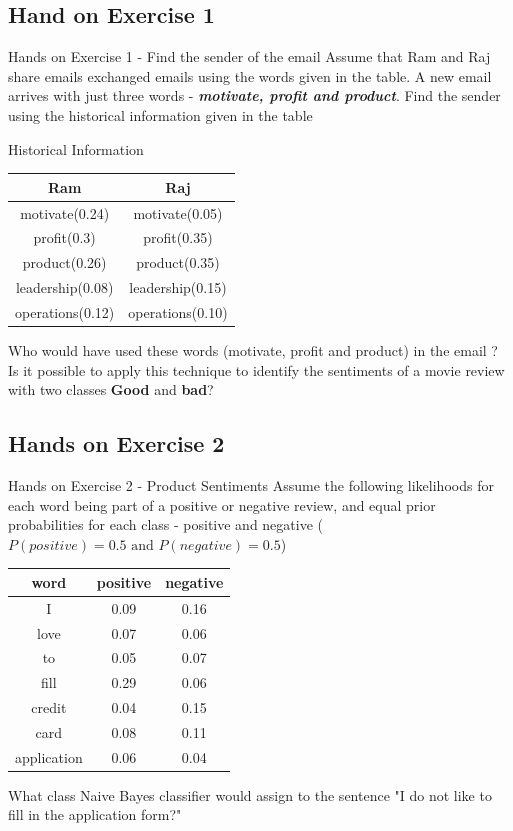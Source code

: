 	\subsection{Hand on Exercise 1 }
	\begin{frame}{Hands on Exercise 1 - Find the sender of the email}
		Assume that Ram and Raj share emails exchanged emails using the words given in the table. A new email arrives with just three words -
		\textbf{\textit{motivate, profit and product}}.
		Find the sender using the historical information given in the table\\
		\begin{center}
			Historical Information\\
			\medskip
			\begin{tabular}{||c|c||}
				\hline
				Ram &Raj\\
				\hline
				motivate(0.24) & 		motivate(0.05)\\
				\hline
				profit(0.3)& 			profit(0.35)\\
				\hline
				product(0.26)& 			product(0.35)	\\
				\hline
				leadership(0.08)&		leadership(0.15)\\
				\hline
				operations(0.12) &		operations(0.10)\\
				\hline
			\end{tabular}
		\end{center}

	Who would have used these words (motivate, profit and product) in the email ?
	\\
		Is it possible to apply this technique to identify the sentiments of a movie review with two classes \textbf{Good} and \textbf{bad}?
	\end{frame}
	\subsection{Hands on Exercise 2}
	\begin{frame}{Hands on Exercise 2 - Product Sentiments}
		Assume the following likelihoods for each word being part of a positive or
		negative review, and equal prior probabilities for each class - positive and negative ($P(positive)=0.5 \text{ and } P(negative) = 0.5$)
		\begin{center}
		\begin{tabular}{||c|c|c||}
			\hline
			word&positive&negative\\
			\hline
			I&0.09&0.16\\
			\hline
			love &0.07& 0.06\\
			\hline
			to&0.05&0.07\\
			\hline
			fill& 0.29&0.06\\
			\hline
			 credit& 0.04&0.15\\
			 \hline
			 card& 0.08&0.11\\
			 \hline
			 application&0.06&0.04\\
			 \hline
		\end{tabular}
	\end{center}
		What class Naive Bayes classifier would assign to the sentence {\small "I do not like to fill in the application form?"}
	\end{frame}